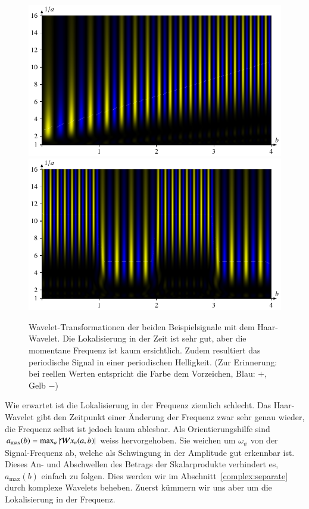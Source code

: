 \begin{figure}
	\centering
	\includegraphics{papers/complex/images/chirp_haar.pdf}
	\includegraphics{papers/complex/images/square_haar.pdf}
	\caption{Wavelet-Transformationen der beiden Beispielsignale mit dem Haar-Wavelet. 
		Die Lokalisierung in der Zeit ist sehr gut, aber die momentane Frequenz ist kaum ersichtlich. 
		Zudem resultiert das periodische Signal in einer periodischen Helligkeit. 
		(Zur Erinnerung: bei reellen Werten entspricht die Farbe dem Vorzeichen, Blau: $+$, Gelb $-$)
	}
	\label{complex:haar-ex}
\end{figure}

Wie erwartet ist die Lokalisierung in der Frequenz ziemlich schlecht.
Das Haar-Wavelet gibt den Zeitpunkt einer Änderung der Frequenz zwar sehr genau wieder, die Frequenz selbst ist jedoch kaum ablesbar.
Als Orientierungshilfe sind $a_\text{max} (b) = \max_a{|\!\Wave x_n(a,b)|}$ weiss hervorgehoben.
Sie weichen um $\omega_\psi$ von der Signal-Frequenz ab, welche als Schwingung in der Amplitude gut erkennbar ist.
Dieses An- und Abschwellen des Betrags der Skalarprodukte verhindert es, $a_\text{max}(b)$ einfach zu folgen.
Dies werden wir im Abschnitt~\ref{complex:separate} durch komplexe Wavelets beheben.
Zuerst kümmern wir uns aber um die Lokalisierung in der Frequenz.
